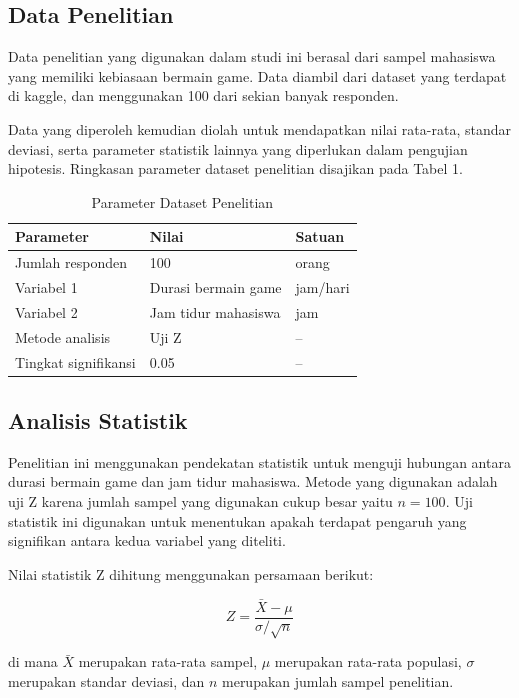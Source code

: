 \documentclass[metlit,article,accept,pdftex,moreauthors]{Definitions/mdpi}
\begin{document}
\subsection{Data Penelitian}
Data penelitian yang digunakan dalam studi ini berasal dari sampel mahasiswa yang memiliki kebiasaan bermain game. Data diambil dari dataset yang terdapat di kaggle, dan menggunakan 100 dari sekian banyak responden.

Data yang diperoleh kemudian diolah untuk mendapatkan nilai rata-rata, standar deviasi, serta parameter statistik lainnya yang diperlukan dalam pengujian hipotesis. Ringkasan parameter dataset penelitian disajikan pada Tabel 1.

\begin{table}[h]
\centering
\caption{Parameter Dataset Penelitian}
\begin{tabular}{lll}
\hline
\textbf{Parameter} & \textbf{Nilai} & \textbf{Satuan} \\
\hline
Jumlah responden & 100 & orang \\
Variabel 1 & Durasi bermain game & jam/hari \\
Variabel 2 & Jam tidur mahasiswa & jam \\
Metode analisis & Uji Z & -- \\
Tingkat signifikansi & 0.05 & -- \\
\hline
\end{tabular}
\end{table}

\subsection{Analisis Statistik}
Penelitian ini menggunakan pendekatan statistik untuk menguji hubungan antara durasi bermain game dan jam tidur mahasiswa. Metode yang digunakan adalah uji Z karena jumlah sampel yang digunakan cukup besar yaitu $n = 100$. Uji statistik ini digunakan untuk menentukan apakah terdapat pengaruh yang signifikan antara kedua variabel yang diteliti.

Nilai statistik Z dihitung menggunakan persamaan berikut:

\begin{equation}
Z = \frac{\bar{X} - \mu}{\sigma / \sqrt{n}}
\end{equation}

di mana $\bar{X}$ merupakan rata-rata sampel, $\mu$ merupakan rata-rata populasi, $\sigma$ merupakan standar deviasi, dan $n$ merupakan jumlah sampel penelitian.
\end{document}
